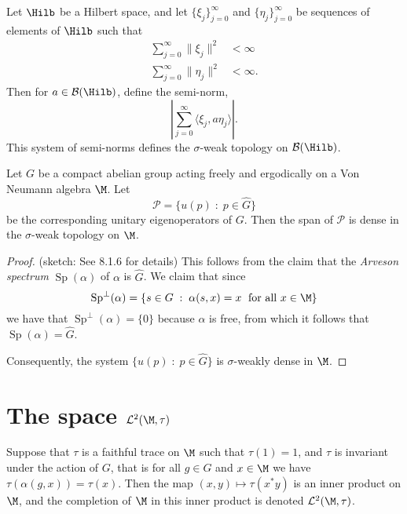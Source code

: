 \begin{definition}
    Let $\Hilb$ be a Hilbert space, and let $\{\xi_j\}_{j = 0}^\infty$
    and $\{\eta_j\}_{j=0}^\infty$ be sequences of elements of $\Hilb$
    such that 
    \begin{align}
        \sum_{j=0}^\infty \|\xi_j\|^2 &< \infty\\
        \sum_{j=0}^\infty \|\eta_j\|^2 &< \infty.
    \end{align}
    Then for $a \in \mathcal{B}(\Hilb)$, define the semi-norm,
    \begin{equation}
        \left| \sum_{j=0}^\infty \langle \xi_j,a\eta_j\rangle\right|.
    \end{equation}
    This system of semi-norms defines the $\sigma$-weak topology
    on $\mathcal{B}(\Hilb)$.
\end{definition}



\begin{proposition}
    Let $G$ be a compact abelian group acting freely and ergodically 
    on a Von Neumann algebra $\M$. Let
    \begin{equation}
        \mathcal{P} = \{ u(p)\;:\; p \in \widehat{G}\}
    \end{equation}
    be the corresponding unitary eigenoperators of $G$. Then the span
    of $\mathcal{P}$ is dense in the $\sigma$-weak topology on $\M$.
\end{proposition}
\begin{proof}
    (sketch: See \cite{Pedersen1979} 8.1.6 for details) This follows from the claim that the \emph{Arveson spectrum}
    $\operatorname{Sp}(\alpha)$
    of $\alpha$ is $\widehat{G}$. We claim that since
    \begin{equation}
        \operatorname{Sp}^{\perp}(\alpha) = \{ s \in G\;:\; \alpha(s,x) = x\;\text{ for all }x \in \M\}
    \end{equation} 
    we have that $\operatorname{Sp}^\perp(\alpha) = \{0\}$ because $\alpha$
    is free,
    from which it follows that $\operatorname{Sp}(\alpha) = \widehat{G}$.
    
    Consequently, the system $\{u(p)\;:\; p \in \widehat{G}\}$ is $\sigma$-weakly
    dense in $\M$.
\end{proof}

\section{The space $\mathcal{L}^2(\M,\tau)$}
Suppose that $\tau$ is a faithful trace on $\M$ such that $\tau(1) = 1$,
and $\tau$ is invariant under the action of $G$, that is for
all $g \in G$ and $x \in \M$ we have $\tau(\alpha(g,x)) = \tau(x)$. 
Then the map $(x,y)\mapsto \tau(x^*y)$ is an inner product on $\M$,
and the completion of $\M$ in this inner product is denoted $\mathcal{L}^2(\M,\tau)$.

